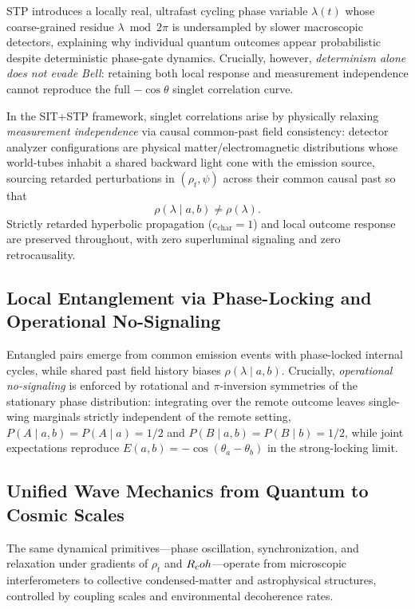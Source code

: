 STP introduces a locally real, ultrafast cycling phase variable $\lambda(t)$ whose coarse-grained residue $\lambda \bmod 2\pi$ is undersampled by slower macroscopic detectors, explaining why individual quantum outcomes appear probabilistic despite deterministic phase-gate dynamics. Crucially, however, \emph{determinism alone does not evade Bell}: retaining both local response and measurement independence cannot reproduce the full $-\cos\theta$ singlet correlation curve.

In the SIT+STP framework, singlet correlations arise by physically relaxing \emph{measurement independence} via causal common-past field consistency: detector analyzer configurations are physical matter/electromagnetic distributions whose world-tubes inhabit a shared backward light cone with the emission source, sourcing retarded perturbations in $(\rho_t, \psi)$ across their common causal past so that
\begin{equation}
\rho(\lambda \mid a, b) \ne \rho(\lambda).
\label{eq:bell_common_past_relaxation}
\end{equation}
Strictly retarded hyperbolic propagation ($c_{\mathrm{char}} = 1$) and local outcome response are preserved throughout, with zero superluminal signaling and zero retrocausality.

\subsection{Local Entanglement via Phase-Locking and Operational No-Signaling}

Entangled pairs emerge from common emission events with phase-locked internal cycles, while shared past field history biases $\rho(\lambda \mid a, b)$. Crucially, \emph{operational no-signaling} is enforced by rotational and $\pi$-inversion symmetries of the stationary phase distribution: integrating over the remote outcome leaves single-wing marginals strictly independent of the remote setting, $P(A \mid a, b) = P(A \mid a) = 1/2$ and $P(B \mid a, b) = P(B \mid b) = 1/2$, while joint expectations reproduce $E(a,b) = -\cos(\theta_a - \theta_b)$ in the strong-locking limit.

\subsection{Unified Wave Mechanics from Quantum to Cosmic Scales}

The same dynamical primitives---phase oscillation, synchronization, and relaxation under gradients of $\rho_t$ and $R_coh$---operate from microscopic interferometers to collective condensed-matter and astrophysical structures, controlled by coupling scales and environmental decoherence rates.

